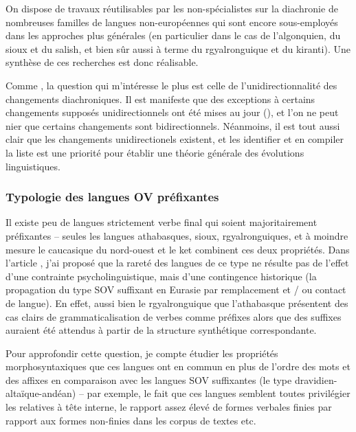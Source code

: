 \documentclass[oldfontcommands,oneside,a4paper,11pt]{article}
\begin{document}
On dispose de travaux réutilisables par les non-spécialistes sur la diachronie de nombreuses familles de langues non-européennes qui sont encore sous-employés dans les approches plus générales (en particulier dans le cas de l'algonquien, du sioux et du salish, et bien sûr aussi à terme du rgyalronguique et du kiranti). Une synthèse de ces recherches est donc réalisable.

 Comme \citet{haspelmath90passive}, la question qui m'intéresse le plus est celle de l'unidirectionnalité des changements diachroniques. Il est manifeste que des exceptions à certains changements supposés unidirectionnels ont été mises au jour (\citealt{norde09degrammaticalization}), et  l'on ne peut nier que certains changements sont bidirectionnels. Néanmoins, il est tout aussi clair que les changements unidirectionels existent, et les identifier et en compiler la liste est une priorité pour établir une théorie générale des évolutions linguistiques.  
 
 
 
  \subsubsection{Typologie des langues OV préfixantes} 
 Il existe peu de langues strictement verbe final qui soient majoritairement préfixantes -- seules les langues athabasques, sioux, rgyalronguiques, et à moindre mesure le caucasique du nord-ouest et le ket combinent ces deux propriétés. Dans l'article  \citet{jacques13harmonization}, j'ai proposé que la rareté des langues de ce type ne résulte pas de l'effet d'une contrainte psycholinguistique, mais d'une contingence historique (la propagation du type SOV suffixant en Eurasie par remplacement et / ou contact de langue).  En effet, aussi bien le rgyalronguique que l'athabasque présentent des cas clairs de grammaticalisation de verbes comme préfixes alors que des suffixes auraient été attendus à partir de la structure synthétique correspondante.
 
Pour approfondir cette question, je compte étudier les propriétés morphosyntaxiques que ces langues ont en commun en plus de l'ordre des mots et des affixes en comparaison avec les langues SOV suffixantes (le type dravidien-altaïque-andéan) -- par exemple, le fait que ces langues semblent toutes privilégier les relatives à tête interne, le rapport assez élevé de formes verbales finies par rapport aux formes non-finies dans les corpus de textes etc. 
\end{document}
